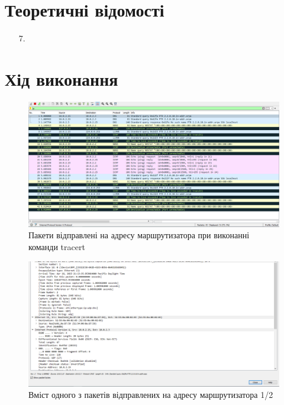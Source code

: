 \documentclass{article}
\begin{document}
\begin{normalsize}
\section*{Теоретичні відомості}
\begin{enumerate}
	\item[7.] 
\end{enumerate}

\section*{Хід виконання}

\begin{figure}[H]
	\centering
	\includegraphics[width=\textwidth]{11}
	\caption{Пакети відправлені на адресу маршрутизатора при виконанні команди tracert}
\end{figure}

\begin{figure}[H]
	\centering
	\includegraphics[width=\textwidth]{12}
	\caption{Вміст одного з пакетів відправлених на адресу маршрутизатора 1/2}
\end{figure}


\end{normalsize}
\end{document}
